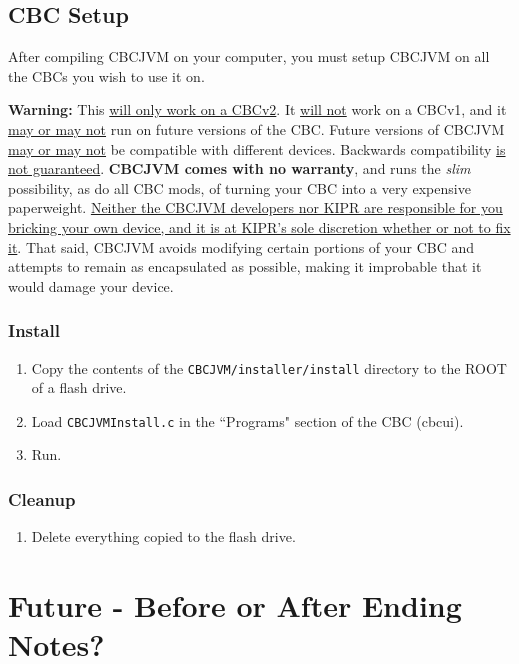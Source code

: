 \documentclass[12pt,letterpaper]{article}
\begin{document}
\subsection{CBC Setup}

After compiling CBCJVM on your computer, you must setup CBCJVM on all the CBCs you wish to use it on.

\textbf{Warning:} This \uline{will only work on a CBCv2}. It \uline{will not} work on a CBCv1, and it \uline{may or may not} run on future versions of the CBC. Future versions of CBCJVM \uline{may or may not} be compatible with different devices. Backwards compatibility \uline{is not guaranteed}. \textbf{CBCJVM comes with no warranty}, and runs the \emph{slim} possibility, as do all CBC mods, of turning your CBC into a very expensive paperweight. \uline{Neither the CBCJVM developers nor KIPR are responsible for you bricking your own device, and it is at KIPR's sole discretion whether or not to fix it}. That said, CBCJVM avoids modifying certain portions of your CBC and attempts to remain as encapsulated as possible, making it improbable that it would damage your device.



\subsubsection{Install}

\begin{enumerate}
\item Copy the contents of the \texttt{CBCJVM/installer/install} directory to the ROOT of a flash drive.
\item Load \texttt{CBCJVMInstall.c} in the ``Programs" section of the CBC (cbcui).
\item Run.
\end{enumerate}



\subsubsection{Cleanup}

\begin{enumerate}
\item Delete everything copied to the flash drive.
\end{enumerate}

\section{Future - Before or After Ending Notes?}
\end{document}
